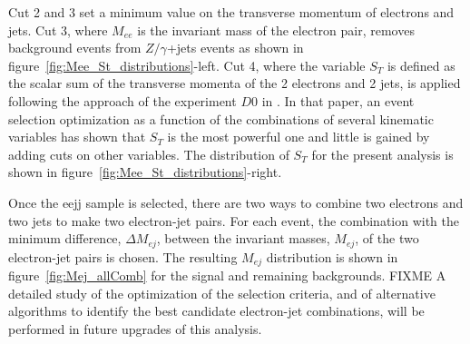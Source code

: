 Cut 2 and 3 set a minimum value on the transverse momentum of electrons and jets.
Cut 3, where $M_{ee}$ is the invariant mass of the electron pair, removes background events from 
$Z/\gamma$+jets events as shown in figure~\ref{fig:Mee_St_distributions}-left.
Cut 4, where the variable $S_T$ is defined as the scalar sum of the transverse momenta of the 
2 electrons and 2 jets, is applied following the approach of the experiment $D0$ in 
\cite{Abazov:2001mx}. In that paper, an event selection optimization as a function of
the combinations of several kinematic variables has shown that $S_T$ is the most powerful one 
and little is gained by adding cuts on other variables. The distribution of $S_T$ for the present
analysis is shown in figure~\ref{fig:Mee_St_distributions}-right.

Once the eejj sample is selected, there are two ways to combine two electrons and two jets to make two electron-jet pairs. 
For each event, the combination with the minimum difference, $\Delta M_{ej}$, between the invariant masses, $M_{ej}$, 
of the two electron-jet pairs is chosen. 
The resulting $M_{ej}$ distribution is shown in figure~\ref{fig:Mej_allComb} for the signal and remaining backgrounds. 
FIXME   A detailed study of the optimization of the selection criteria, and of alternative algorithms to identify the best candidate 
electron-jet combinations, will be performed in future upgrades of this analysis.

